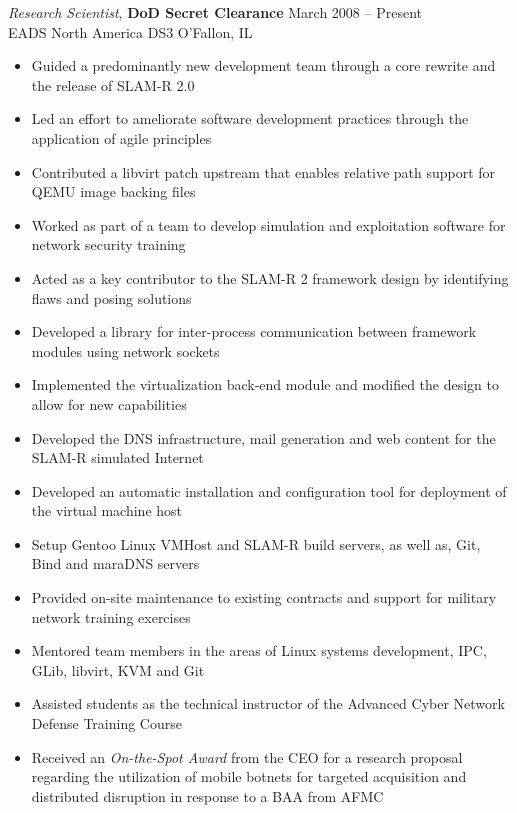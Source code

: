 \documentclass[margin,line]{resume}
\begin{document}
\begin{resume}
{\sl Research Scientist}, \textbf{\small DoD Secret Clearance}   \hfill  March 2008 -- Present\\
EADS North America DS3                                          \hfill  O'Fallon, IL
\begin{itemize} \itemsep -2pt %
\small\item Guided a predominantly new development team through a core rewrite and the release of SLAM-R 2.0
\small\item Led an effort to ameliorate software development practices through the application of agile principles
\small\item Contributed a libvirt patch upstream that enables relative path support for QEMU image backing files
\small\item Worked as part of a team to develop simulation and exploitation software for network security training
\small\item Acted as a key contributor to the SLAM-R 2 framework design by identifying flaws and posing solutions
\small\item Developed a library for inter-process communication between framework modules using network sockets
\small\item Implemented the virtualization back-end module and modified the design to allow for new capabilities
\small\item Developed the DNS infrastructure, mail generation and web content for the SLAM-R simulated Internet
\small\item Developed an automatic installation and configuration tool for deployment of the virtual machine host 
\small\item Setup Gentoo Linux VMHost and SLAM-R build servers, as well as, Git, Bind and maraDNS servers
\small\item Provided on-site maintenance to existing contracts and support for military network training exercises
\small\item Mentored team members in the areas of Linux systems development, IPC, GLib, libvirt, KVM and Git
\small\item Assisted students as the technical instructor of the Advanced Cyber Network Defense Training Course
\small\item Received an {\sl On-the-Spot Award} from the CEO for a research proposal regarding the utilization of
            mobile botnets for targeted acquisition and distributed disruption in response to a BAA from AFMC


\end{itemize}
\end{resume}
\end{document}
